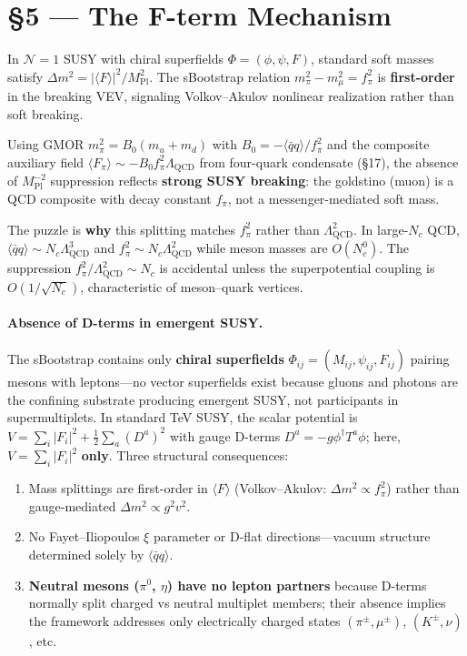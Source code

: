 \documentclass[11pt,a4paper]{article}
\newcommand{\Lqcd}{\Lambda_{\text{QCD}}}
\newcommand{\fpi}{f_\pi}
\newcommand{\mpi}{m_\pi}
\newcommand{\mmu}{m_\mu}
\newcommand{\qqbar}{\langle\bar{q}q\rangle}
\newcommand{\Nc}{N_c}
\begin{document}
\section*{\S 5 --- The F-term Mechanism}

In $\mathcal{N}=1$ SUSY with chiral superfields $\Phi = (\phi, \psi, F)$, standard soft masses satisfy $\Delta m^2 = |\langle F \rangle|^2/M_{\text{Pl}}^2$.  The sBootstrap relation $\mpi^2 - \mmu^2 = \fpi^2$ is \textbf{first-order} in the breaking VEV, signaling Volkov--Akulov nonlinear realization rather than soft breaking.

Using GMOR $\mpi^2 = B_0(m_u+m_d)$ with $B_0=-\qqbar/\fpi^2$ and the composite auxiliary field $\langle F_\pi\rangle \sim -B_0 \fpi^2 \Lqcd$ from four-quark condensate (\S 17), the absence of $M_{\text{Pl}}^{-2}$ suppression reflects \textbf{strong SUSY breaking}: the goldstino (muon) is a QCD composite with decay constant $\fpi$, not a messenger-mediated soft mass.

The puzzle is \textbf{why} this splitting matches $\fpi^2$ rather than $\Lqcd^2$.  In large-$\Nc$ QCD, $\qqbar \sim \Nc \Lqcd^3$ and $\fpi^2 \sim \Nc \Lqcd^2$ while meson masses are $O(\Nc^0)$.  The suppression $\fpi^2/\Lqcd^2 \sim \Nc$ is accidental unless the superpotential coupling is $O(1/\sqrt{\Nc})$, characteristic of meson--quark vertices.

\paragraph{Absence of D-terms in emergent SUSY.}
The sBootstrap contains only \textbf{chiral superfields} $\Phi_{ij} = (M_{ij}, \psi_{ij}, F_{ij})$ pairing mesons with leptons---no vector superfields exist because gluons and photons are the confining substrate producing emergent SUSY, not participants in supermultiplets.  In standard TeV SUSY, the scalar potential is $V = \sum_i |F_i|^2 + \frac{1}{2}\sum_a (D^a)^2$ with gauge D-terms $D^a = -g\phi^\dagger T^a\phi$; here, $V = \sum_i |F_i|^2$ \textbf{only}.  Three structural consequences:
\begin{enumerate}\item Mass splittings are first-order in $\langle F \rangle$ (Volkov--Akulov: $\Delta m^2 \propto \fpi^2$) rather than gauge-mediated $\Delta m^2 \propto g^2 v^2$.
\item No Fayet--Iliopoulos $\xi$ parameter or D-flat directions---vacuum structure determined solely by $\qqbar$.
\item \textbf{Neutral mesons ($\pi^0$, $\eta$) have no lepton partners} because D-terms normally split charged vs neutral multiplet members; their absence implies the framework addresses only electrically charged states $(\pi^\pm, \mu^\pm)$, $(K^\pm, \nu)$, etc.
\end{enumerate}
\end{document}
